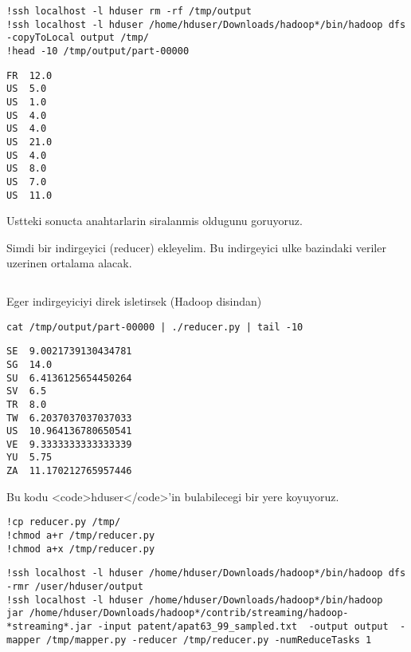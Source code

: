 \documentclass[12pt,fleqn]{article}\usepackage{../common}
\begin{document}
\begin{verbatim}
!ssh localhost -l hduser rm -rf /tmp/output
!ssh localhost -l hduser /home/hduser/Downloads/hadoop*/bin/hadoop dfs  -copyToLocal output /tmp/
!head -10 /tmp/output/part-00000
\end{verbatim}

\begin{verbatim}
FR	12.0
US	5.0
US	1.0
US	4.0
US	4.0
US	21.0
US	4.0
US	8.0
US	7.0
US	11.0
\end{verbatim}

Ustteki sonucta anahtarlarin siralanmis oldugunu goruyoruz.

Simdi bir indirgeyici (reducer) ekleyelim. Bu indirgeyici ulke bazindaki
veriler uzerinen ortalama alacak. 

\inputminted{python}{reducer.py}

Eger indirgeyiciyi direk isletirsek (Hadoop disindan)

\begin{verbatim}
cat /tmp/output/part-00000 | ./reducer.py | tail -10
\end{verbatim}

\begin{verbatim}
SE	9.0021739130434781
SG	14.0
SU	6.4136125654450264
SV	6.5
TR	8.0
TW	6.2037037037037033
US	10.964136780650541
VE	9.3333333333333339
YU	5.75
ZA	11.170212765957446
\end{verbatim}

Bu kodu <code>hduser</code>'in bulabilecegi bir yere koyuyoruz. 

\begin{verbatim}
!cp reducer.py /tmp/
!chmod a+r /tmp/reducer.py
!chmod a+x /tmp/reducer.py
\end{verbatim}

\begin{verbatim}
!ssh localhost -l hduser /home/hduser/Downloads/hadoop*/bin/hadoop dfs -rmr /user/hduser/output
!ssh localhost -l hduser /home/hduser/Downloads/hadoop*/bin/hadoop  jar /home/hduser/Downloads/hadoop*/contrib/streaming/hadoop-*streaming*.jar -input patent/apat63_99_sampled.txt  -output output  -mapper /tmp/mapper.py -reducer /tmp/reducer.py -numReduceTasks 1 
\end{verbatim}
\end{document}
